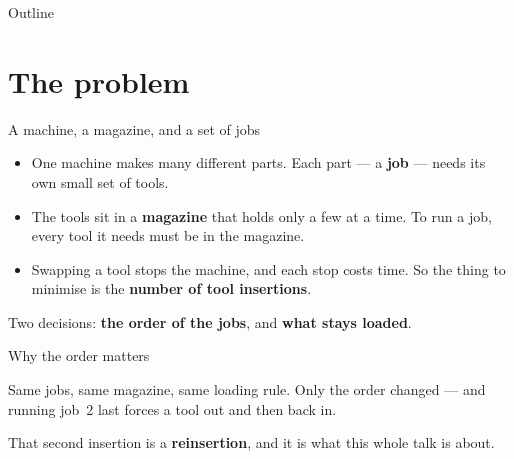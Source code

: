 
\begin{frame}[plain]\titlepage\end{frame}

\begin{frame}{Outline}\tableofcontents\end{frame}

\renewcommand{\sectionblurb}{What the machine actually does, why the job order changes the cost, and the two questions this work answers.}
\section{The problem}

\begin{frame}{A machine, a magazine, and a set of jobs}
\vspace{0.1cm}
\begingroup\centering
\scalebox{.88}{}
\par\endgroup
\vspace{0.3cm}
\begin{itemize}\itemsep5pt
  \item One machine makes many different parts. Each part --- a \textbf{job} --- needs its
        own small set of tools.
  \item The tools sit in a \textbf{magazine} that holds only a few at a time. To run a job,
        every tool it needs must be in the magazine.
  \item Swapping a tool stops the machine, and each stop costs time. So the thing to
        minimise is the \textbf{number of tool insertions}.
\end{itemize}
\vspace{0.3cm}
\centering
Two decisions: \textbf{the order of the jobs}, and \textbf{what stays loaded}.
\end{frame}

\begin{frame}{Why the order matters}
\vspace{0.1cm}
\begingroup\centering
\scalebox{1.0}{}
\par\endgroup
\vspace{0.35cm}
Same jobs, same magazine, same loading rule. Only the order changed --- and running job~2
last forces a tool out and then back in.

\vspace{0.32cm}
\centering
That second insertion is a \textbf{reinsertion}, and it is what this whole talk is about.
\end{frame}

